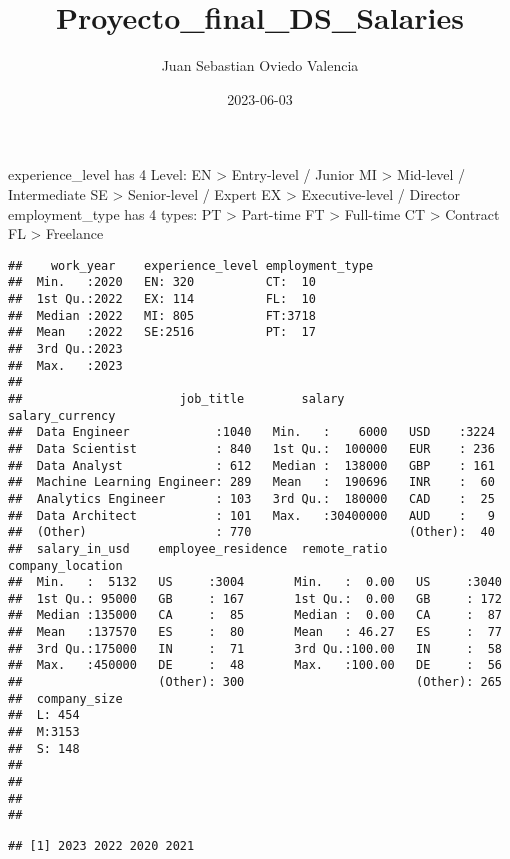 \documentclass[
]{article}
\title{Proyecto\_final\_DS\_Salaries}
\author{Juan Sebastian Oviedo Valencia}
\date{2023-06-03}
\begin{document}
\maketitle

experience\_level has 4 Level: EN \textgreater{} Entry-level / Junior MI
\textgreater{} Mid-level / Intermediate SE \textgreater{} Senior-level /
Expert EX \textgreater{} Executive-level / Director employment\_type has
4 types: PT \textgreater{} Part-time FT \textgreater{} Full-time CT
\textgreater{} Contract FL \textgreater{} Freelance

\begin{verbatim}
##    work_year    experience_level employment_type
##  Min.   :2020   EN: 320          CT:  10        
##  1st Qu.:2022   EX: 114          FL:  10        
##  Median :2022   MI: 805          FT:3718        
##  Mean   :2022   SE:2516          PT:  17        
##  3rd Qu.:2023                                   
##  Max.   :2023                                   
##                                                 
##                      job_title        salary         salary_currency
##  Data Engineer            :1040   Min.   :    6000   USD    :3224   
##  Data Scientist           : 840   1st Qu.:  100000   EUR    : 236   
##  Data Analyst             : 612   Median :  138000   GBP    : 161   
##  Machine Learning Engineer: 289   Mean   :  190696   INR    :  60   
##  Analytics Engineer       : 103   3rd Qu.:  180000   CAD    :  25   
##  Data Architect           : 101   Max.   :30400000   AUD    :   9   
##  (Other)                  : 770                      (Other):  40   
##  salary_in_usd    employee_residence  remote_ratio    company_location
##  Min.   :  5132   US     :3004       Min.   :  0.00   US     :3040    
##  1st Qu.: 95000   GB     : 167       1st Qu.:  0.00   GB     : 172    
##  Median :135000   CA     :  85       Median :  0.00   CA     :  87    
##  Mean   :137570   ES     :  80       Mean   : 46.27   ES     :  77    
##  3rd Qu.:175000   IN     :  71       3rd Qu.:100.00   IN     :  58    
##  Max.   :450000   DE     :  48       Max.   :100.00   DE     :  56    
##                   (Other): 300                        (Other): 265    
##  company_size
##  L: 454      
##  M:3153      
##  S: 148      
##              
##              
##              
## 
\end{verbatim}

\begin{verbatim}
## [1] 2023 2022 2020 2021
\end{verbatim}
\end{document}
